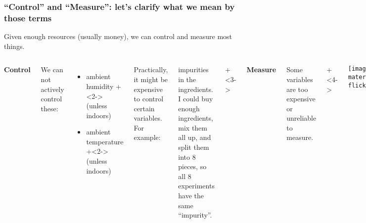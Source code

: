 \begin{frame}\frametitle{``Control'' and ``Measure'': let's clarify what we mean by those terms}
	
	{\color{myOrange}Given enough resources (usually money), we can control and measure most things.}
	
	\begin{columns}[T]
			\begin{center}\textbf{Control}\end{center}
				
			We can not actively control these:
			\begin{itemize}
				\item	ambient humidity \onslide+<2->{(unless indoors)}
				\item	ambient temperature \onslide+<2->{(unless indoors)}
			\end{itemize}
			
			\vspace{1cm}
			Practically, it might be expensive to control certain variables. For example: 
			
			impurities in the ingredients. I could buy enough
			ingredients, mix them all up, and split them into 8 pieces, so all
			8 experiments have the same ``impurity''.
		
			\onslide+<3->{
				\begin{center}\textbf{Measure}\end{center}
			
				Some variables are too expensive or unreliable to measure.
			
				\onslide+<4->{
					\begin{center}
						\texttt{[image: ../4D/Supporting materials/5937291945\_4e961c8baa\_o-flickr-humidity-modified.png]}
					\end{center}
				}
			}
			
	\end{columns}
	
\end{frame}

